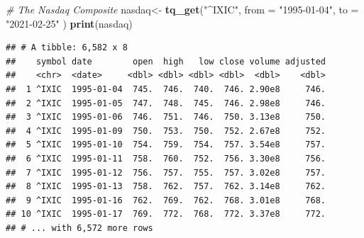 \documentclass[]{book}
\newenvironment{Shaded}{\begin{snugshade}}{\end{snugshade}}
\newcommand{\CommentTok}[1]{\textcolor[rgb]{0.56,0.35,0.01}{\textit{#1}}}
\newcommand{\DataTypeTok}[1]{\textcolor[rgb]{0.13,0.29,0.53}{#1}}
\newcommand{\KeywordTok}[1]{\textcolor[rgb]{0.13,0.29,0.53}{\textbf{#1}}}
\newcommand{\NormalTok}[1]{#1}
\newcommand{\StringTok}[1]{\textcolor[rgb]{0.31,0.60,0.02}{#1}}
\begin{document}
\begin{Shaded}
\begin{Highlighting}[]
\CommentTok{# The Nasdaq Composite }
\NormalTok{nasdaq<-}\StringTok{ }\KeywordTok{tq_get}\NormalTok{(}\StringTok{"^IXIC"}\NormalTok{, }\DataTypeTok{from =} \StringTok{"1995-01-04"}\NormalTok{, }\DataTypeTok{to =} \StringTok{"2021-02-25"}\NormalTok{ )}
\KeywordTok{print}\NormalTok{(nasdaq)}
\end{Highlighting}
\end{Shaded}

\begin{verbatim}
## # A tibble: 6,582 x 8
##    symbol date        open  high   low close volume adjusted
##    <chr>  <date>     <dbl> <dbl> <dbl> <dbl>  <dbl>    <dbl>
##  1 ^IXIC  1995-01-04  745.  746.  740.  746. 2.90e8     746.
##  2 ^IXIC  1995-01-05  747.  748.  745.  746. 2.98e8     746.
##  3 ^IXIC  1995-01-06  746.  751.  746.  750. 3.13e8     750.
##  4 ^IXIC  1995-01-09  750.  753.  750.  752. 2.67e8     752.
##  5 ^IXIC  1995-01-10  754.  759.  754.  757. 3.54e8     757.
##  6 ^IXIC  1995-01-11  758.  760.  752.  756. 3.30e8     756.
##  7 ^IXIC  1995-01-12  756.  757.  755.  757. 3.02e8     757.
##  8 ^IXIC  1995-01-13  758.  762.  757.  762. 3.14e8     762.
##  9 ^IXIC  1995-01-16  762.  769.  762.  768. 3.01e8     768.
## 10 ^IXIC  1995-01-17  769.  772.  768.  772. 3.37e8     772.
## # ... with 6,572 more rows
\end{verbatim}
\end{document}
